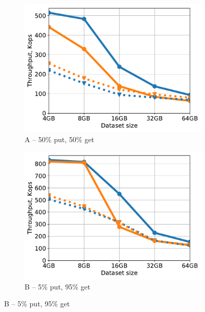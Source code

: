 \begin{figure}[tb]
\centering
\begin{subfigure}{0.49\columnwidth}
\includegraphics[width=\textwidth]{figs/Workload_A_line.pdf}
\caption{A -- 50\% put, 50\% get}
\label{fig:throughput:a}
\end{subfigure}
\begin{subfigure}{0.49\columnwidth}
\includegraphics[width=\textwidth]{figs/Workload_B_line.pdf}
\caption{B -- 5\% put, 95\% get}
\label{fig:throughput:b}
\end{subfigure}

\end{figure}
